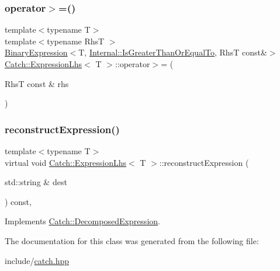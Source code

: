 \subsubsection{\texorpdfstring{operator$>$=()}{operator>=()}}
{\footnotesize\ttfamily template$<$typename T$>$ \\
template$<$typename RhsT $>$ \\
\mbox{\hyperlink{class_catch_1_1_binary_expression}{Binary\+Expression}}$<$T, \mbox{\hyperlink{namespace_catch_1_1_internal_ae3f96598a7858155750bf38e7295d83ead2de7e9565e59e36c0987e402203ce1c}{Internal\+::\+Is\+Greater\+Than\+Or\+Equal\+To}}, RhsT const\&$>$ \mbox{\hyperlink{class_catch_1_1_expression_lhs}{Catch\+::\+Expression\+Lhs}}$<$ T $>$\+::operator$>$= (\begin{DoxyParamCaption}\item[{RhsT const \&}]{rhs }\end{DoxyParamCaption})\hspace{0.3cm}{\ttfamily [inline]}}

\mbox{\label{class_catch_1_1_expression_lhs_a7684a053e8e88a4be475a536252630da}} 
\subsubsection{\texorpdfstring{reconstruct\+Expression()}{reconstructExpression()}}
{\footnotesize\ttfamily template$<$typename T$>$ \\
virtual void \mbox{\hyperlink{class_catch_1_1_expression_lhs}{Catch\+::\+Expression\+Lhs}}$<$ T $>$\+::reconstruct\+Expression (\begin{DoxyParamCaption}\item[{std\+::string \&}]{dest }\end{DoxyParamCaption}) const\hspace{0.3cm}{\ttfamily [inline]}, {\ttfamily [virtual]}}



Implements \mbox{\hyperlink{struct_catch_1_1_decomposed_expression_a9ce7f356dc96f11f80e40c82f5aa7e55}{Catch\+::\+Decomposed\+Expression}}.



The documentation for this class was generated from the following file\+:\begin{DoxyCompactItemize}
\item 
include/\mbox{\hyperlink{catch_8hpp}{catch.\+hpp}}\end{DoxyCompactItemize}
